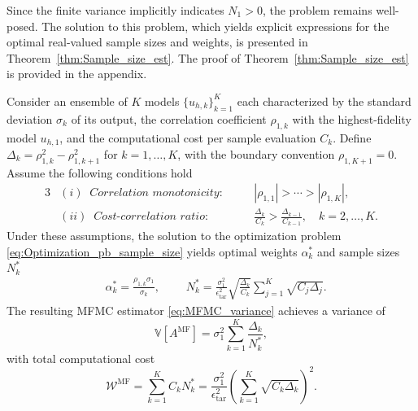%
Since the finite variance implicitly indicates $N_1 > 0$, the problem remains well-posed. The solution to this problem, which yields explicit expressions for the optimal real-valued sample sizes and weights, is presented in Theorem~\ref{thm:Sample_size_est}. The proof of Theorem~\ref{thm:Sample_size_est} is provided in the appendix.




%
\begin{theorem}
\label{thm:Sample_size_est}
Consider an ensemble of $K$ models $\{u_{h,k}\}_{k=1}^K$ each characterized by the standard deviation $\sigma_k$ of its output, the correlation coefficient $\rho_{1,k}$ with the highest-fidelity model $u_{h,1}$, and the computational cost per sample evaluation $C_k$. Define $\Delta_k = \rho_{1,k}^2 - \rho_{1,k+1}^2$ for $k = 1, \dots, K$, with the boundary convention $\rho_{1,K+1} = 0$. Assume the following conditions hold
%
\begin{alignat*}{3}
&(i)\;\; \textit{Correlation monotonicity}: \quad && |\rho_{1,1}| > \cdots > |\rho_{1,K}|, \\ 
&(ii)\;\; \textit{Cost-correlation ratio}: \quad && \frac{\Delta_k}{C_k} > \frac{\Delta_{k-1}}{C_{k-1}}, \quad k=2,\ldots,K. 
\end{alignat*}
%
Under these assumptions, the solution to the optimization problem \eqref{eq:Optimization_pb_sample_size} yields optimal weights $\alpha_k^*$ and sample sizes $N_k^*$
%
\begin{align}
    \label{eq:MFMC_SampleSize}
    &\alpha_k^*=\frac{\rho_{1,k}\sigma_1}{\sigma_k},\qquad \;N_k^*=\frac{\sigma_1^2}{\epsilon_\text{tar}^2}\sqrt{\frac{\Delta_k}{C_k}}\sum_{j=1}^K\sqrt{C_j\Delta_{j}}.
\end{align}
%
The resulting MFMC estimator \eqref{eq:MFMC_variance} achieves a variance of
%
\begin{equation}
\label{eq:MFMC_variance_optimal}
\mathbb{V}\left[A^{\text{MF}}\right] =
\sigma_1^2\sum_{k=1}^K\frac{\Delta_k}{N_k^*},
\end{equation}
%
with total computational cost
%
\begin{equation}\label{eq:MFMC_sampling_cost}
    \mathcal{W}^\text{MF} = \sum_{k=1}^K C_k N_k^* = \frac{\sigma_1^2}{\epsilon_{\text{tar}}^2}\left(\sum_{k=1}^K\sqrt{C_k\Delta_k}\right)^2.
\end{equation}
%
\end{theorem}

